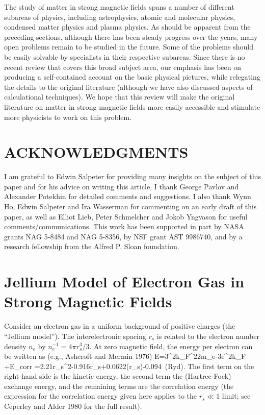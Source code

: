 The study of matter in strong magnetic fields spans a number of different 
subareas of physics, including astrophysics, atomic and molecular physics,
condensed matter physics and plasma physics. 
As should be apparent from the preceding sections, although there has
been steady progress over the years, many open problems remain to be studied 
in the future. Some of the problems should be easily solvable by specialists
in their respective subareas. 
Since there is no recent review that covers this broad subject area,
our emphasis has been on producing a self-contained account on 
the basic physical pictures, while relegating the details to the original
literature (although we have also discussed aspects of calculational 
techniques). We hope that this review will
make the original literature on matter in strong magnetic fields 
more easily accessible and stimulate more physicists to work on this problem. 


\section*{ACKNOWLEDGMENTS}

I am grateful to Edwin Salpeter for providing many insights
on the subject of this paper 
and for his advice on writing this article. 
I thank George Pavlov and Alexander Potekhin 
for detailed comments and suggestions.
I also thank Wynn Ho, Edwin Salpeter and Ira Wasserman for commenting on an
early draft of this paper, 
as well as Elliot Lieb, Peter Schmelcher and Jokob Yngvason for
useful comments/communications. 
This work has been
supported in part by NASA grants NAG 5-8484 and NAG 5-8356, by NSF grant AST
9986740, and by a research fellowship from the Alfred P. Sloan foundation.   

\appendix

\section{Jellium Model of Electron Gas in Strong Magnetic Fields}

Consider an electron gas in a uniform background of positive
charges (the ``Jellium model''). The interelectronic spacing $r_s$ is related
to the electron number density $n_e$ by $n_e^{-1}=4\pi r_s^3/3$. 
At zero magnetic field, the energy per electron can be written as 
(e.g., Ashcroft and Mermin 1976)
\be
E={3}{\hbar^2k_F^2\over 2m_e}-{3}{e^2k_F\over\pi}
+E_{\rm corr}
={2.21\over r_s^2}-{0.916\over r_s}+0.0622\ln(r_s)-0.094~({\rm Ryd}).
\ee
The first term on the right-hand side 
is the kinetic energy, the second term the (Hartree-Fock)
exchange energy, and the remaining terms are the correlation energy 
(the expression for the correlation energy given here 
applies to the $r_s\ll 1$ limit; see Ceperley and Alder 1980 for the full 
result).

